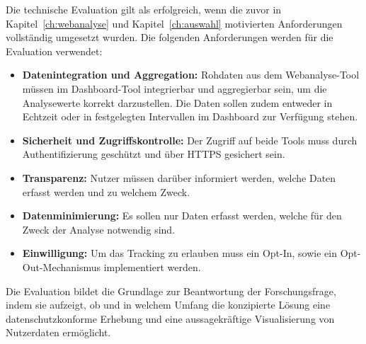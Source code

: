 Die technische Evaluation gilt als erfolgreich, wenn die zuvor in Kapitel~\ref{ch:webanalyse} und Kapitel~\ref{ch:auswahl} motivierten Anforderungen vollständig umgesetzt wurden. Die folgenden Anforderungen werden für die Evaluation verwendet:

\begin{itemize}
    \item \textbf{Datenintegration und Aggregation:} Rohdaten aus dem Webanalyse-Tool müssen im Dashboard-Tool integrierbar und aggregierbar sein, um die Analysewerte korrekt darzustellen. Die Daten sollen zudem entweder in Echtzeit oder in festgelegten Intervallen im Dashboard zur Verfügung stehen.
    \item \textbf{Sicherheit und Zugriffskontrolle:} Der Zugriff auf beide Tools muss durch Authentifizierung geschützt und über HTTPS gesichert sein.
    \item \textbf{Transparenz:} Nutzer müssen darüber informiert werden, welche Daten erfasst werden und zu welchem Zweck.
    \item \textbf{Datenminimierung:} Es sollen nur Daten erfasst werden, welche für den Zweck der Analyse notwendig sind.
    \item \textbf{Einwilligung:} Um das Tracking zu erlauben muss ein Opt-In, sowie ein Opt-Out-Mechanismus implementiert werden.
\end{itemize}

Die Evaluation bildet die Grundlage zur Beantwortung der Forschungsfrage, indem sie aufzeigt, ob und in welchem Umfang die konzipierte Lösung eine datenschutzkonforme Erhebung und eine aussagekräftige Visualisierung von Nutzerdaten ermöglicht.
